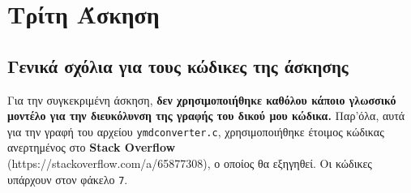 \documentclass[a4paper, 14pt]{article}   %
\begin{document}
\section*{Τρίτη Άσκηση}   %

\subsection*{Γενικά σχόλια για τους κώδικες της άσκησης}   %
	Για την συγκεκριμένη άσκηση, \textbf{δεν χρησιμοποιήθηκε καθόλου κάποιο γλωσσικό μοντέλο για την διευκόλυνση της γραφής του δικού μου κώδικα.} Παρ'όλα, αυτά για την γραφή του αρχείου \texttt{ymd\textunderscore converter.c}, χρησιμοποιήθηκε έτοιμος κώδικας ανερτημένος στο \textbf{Stack Overflow}\\{\small (https://stackoverflow.com/a/65877308)}, ο οποίος θα εξηγηθεί.  Οι κώδικες υπάρχουν στον φάκελο \texttt{7}.
\end{document}
